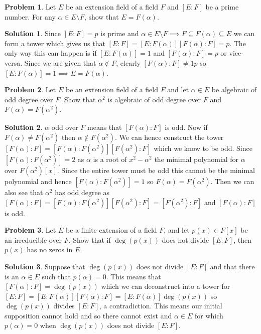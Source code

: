 \documentclass[10pt]{article}
\theoremstyle{definition}
\newtheorem{problem}{Problem}
\newtheorem{soln}{Solution}
\begin{document}
\begin{problem}
Let $E$ be an extension field of a field $F$ and $[E : F ]$ be a prime
number. For any $\alpha \in E\setminus F $, show that $E = F (\alpha)$.
\end{problem}
\begin{soln}
  Since $[E : F ]=p$ is prime and $\alpha \in E\setminus F\implies F\subseteq F(\alpha) \subseteq E$ we can form a tower
  which gives us that
  $[E : F ]=[E : F(\alpha) ][F(\alpha): F ]=p$.
  The only way this can happen is if $[E : F(\alpha) ]=1$ and $[F(\alpha): F ]=p$ or vice-versa. Since we are given that $\alpha \notin F$, clearly
  $[F(\alpha): F ]\neq 1 p$ so $[E : F(\alpha) ]=1\implies E=F(\alpha)$.
\end{soln}

\begin{problem}
Let $E$ be an extension field of a field $F$ and let $\alpha\in E$ be algebraic
of odd degree over $F$. Show that $\alpha^2$ is algebraic of odd degree over
$F$ and $F(\alpha)=F(\alpha^2)$.
\end{problem}
\begin{soln}
  $\alpha$ odd over $F$ means that $[F(\alpha):F]$ is odd. Now if $F(\alpha)\neq F(\alpha^2)$ then $\alpha \notin F(\alpha^2)$.
  We can hence construct the tower $[F(\alpha):F]=[F(\alpha):F(\alpha^2)][F(\alpha^2):F]$ which we know to be odd. Since
  $[F(\alpha):F(\alpha^2)]=2$ as $\alpha$ is a root of $x^2-\alpha^2$ the minimal polynomial for $\alpha$ over $F(\alpha^2)[x]$. Since the
  entire tower must be odd this cannot be the minimal polynomial and hence $[F(\alpha):F(\alpha^2)]=1$ so $F(\alpha)=F(\alpha^2)$. Then we can also
  see that $\alpha^2$ has odd degree as $[F(\alpha):F]=[F(\alpha):F(\alpha^2)][F(\alpha^2):F]=[F(\alpha^2):F]$ and $[F(\alpha):F]$ is odd.
\end{soln}

\begin{problem}
Let $E$ be a finite extension of a field $F$, and let $p(x) \in F [x]$ be an
irreducible over $F$. Show that if $\deg(p(x))$ does not divide $[E : F ]$,
then $p(x)$ has no zeros in $E$.
\end{problem}
\begin{soln}
  Suppose that $\deg(p(x))$ does not divide $[E:F]$ and that there is an $\alpha \in E$ such that $p(\alpha)=0$. This means that $[F(\alpha):F]=\deg(p(x))$
  which we can deconstruct into a tower for
  $[E:F]=[E:F(\alpha)][F(\alpha):F]=[E:F(\alpha)]\deg(p(x))$ so $\deg(p(x))$ divides $[E:F]$, a contradiction. This means our initial supposition cannot hold
  and so there cannot exist and $\alpha\in E$ for which $p(\alpha)=0$ when $\deg(p(x))$ does not divide $[E:F]$.
\end{soln}
\end{document}
